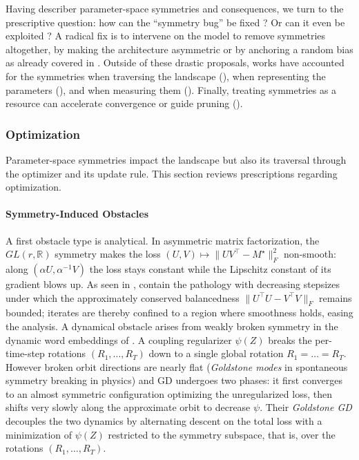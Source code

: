 \documentclass[mathematics,review,submit,moreauthors]{Definitions/mdpi}
\begin{document}
Having describer parameter-space symmetries and consequences, we turn to the prescriptive question: how can the ``symmetry bug'' be fixed ? Or can it even be exploited ?
A radical fix is to intervene on the model to remove symmetries altogether, by making the architecture asymmetric \citep{lim2024} or by anchoring a random bias \citep{ziyin2024b} as already covered in .
Outside of these drastic proposals, works have accounted for the symmetries when traversing the landscape (), when representing the parameters (), and when measuring them ().
Finally, treating symmetries as a resource can accelerate convergence or guide pruning ().

\subsubsection{Optimization}\label{sec:symmetry-optimization}

Parameter-space symmetries impact the landscape but also its traversal through the optimizer and its update rule.
This section reviews prescriptions regarding optimization.

\paragraph{Symmetry-Induced Obstacles}
A first obstacle type is analytical.
In asymmetric matrix factorization, the $GL(r,\mathbb{R})$ symmetry makes the loss $(U,V)\mapsto\lVert UV^{\top}-M^{\star}\rVert_F^2$ non-smooth: along $(\alpha U,\alpha^{-1}V)$ the loss stays constant while the Lipschitz constant of its gradient blows up.
As seen in , \citet{du2018anips} contain the pathology with decreasing stepsizes under which the approximately conserved balancedness $\lVert U^{\top}U-V^{\top}V\rVert_F$ remains bounded; iterates are thereby confined to a region where smoothness holds, easing the analysis.
A dynamical obstacle arises from weakly broken symmetry in the dynamic word embeddings of \citet{bamler2018p3icml}.
A coupling regularizer $\psi(Z)$ breaks the per-time-step rotations $(R_1,\dots,R_T)$ down to a single global rotation $R_1=\dots=R_T$.
However broken orbit directions are nearly flat (\emph{Goldstone modes} in spontaneous symmetry breaking in physics) and GD undergoes two phases: it first converges to an almost symmetric configuration optimizing the unregularized loss, then shifts very slowly along the approximate orbit to decrease $\psi$.
Their \emph{Goldstone GD} decouples the two dynamics by alternating descent on the total loss with a minimization of $\psi(Z)$ restricted to the symmetry subspace, that is, over the rotations $(R_1,\dots,R_T)$.
\end{document}
